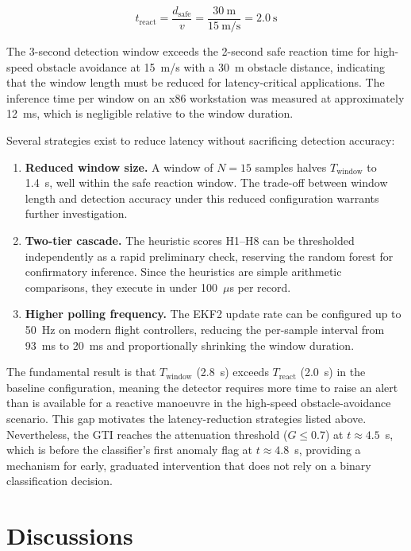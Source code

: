 \documentclass[electronics,article,accept,moreauthors]{Definitions/mdpi}
\begin{document}
\begin{equation}
t_{\text{react}} = \frac{d_{\text{safe}}}{v} = \frac{30~\text{m}}{15~\text{m/s}} = 2.0~\text{s}
\label{eq:latency}
\end{equation}

The 3-second detection window exceeds the 2-second safe reaction time for high-speed obstacle avoidance at 15~m/s with a 30~m obstacle distance, indicating that the window length must be reduced for latency-critical applications. The inference time per window on an x86 workstation was measured at approximately 12~ms, which is negligible relative to the window duration.

Several strategies exist to reduce latency without sacrificing detection accuracy:

\begin{enumerate}
    \item \textbf{Reduced window size.} A window of $N = 15$ samples halves $T_{\text{window}}$ to 1.4~s, well within the safe reaction window. The trade-off between window length and detection accuracy under this reduced configuration warrants further investigation.
    \item \textbf{Two-tier cascade.} The heuristic scores H1--H8 can be thresholded independently as a rapid preliminary check, reserving the random forest for confirmatory inference. Since the heuristics are simple arithmetic comparisons, they execute in under 100~$\mu$s per record.
    \item \textbf{Higher polling frequency.} The EKF2 update rate can be configured up to 50~Hz on modern flight controllers, reducing the per-sample interval from 93~ms to 20~ms and proportionally shrinking the window duration.
\end{enumerate}

The fundamental result is that $T_{\text{window}}$ (2.8~s) exceeds $T_{\text{react}}$ (2.0~s) in the baseline configuration, meaning the detector requires more time to raise an alert than is available for a reactive manoeuvre in the high-speed obstacle-avoidance scenario. This gap motivates the latency-reduction strategies listed above. Nevertheless, the GTI reaches the attenuation threshold ($G \leq 0.7$) at $t \approx 4.5$~s, which is before the classifier's first anomaly flag at $t \approx 4.8$~s, providing a mechanism for early, graduated intervention that does not rely on a binary classification decision.

\section{Discussions}
\label{sec:discussion}
\end{document}
